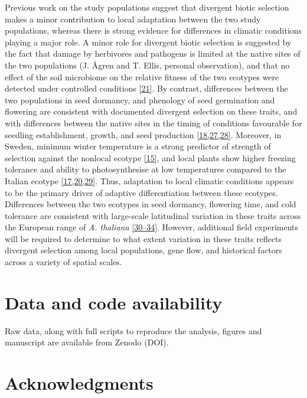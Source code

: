 \documentclass[twocolumn,twoside,lettersize]{article}
\begin{document}
Previous work on the study populations suggest that divergent biotic selection makes a minor contribution to local adaptation between the two study populations, whereas there is strong evidence for differences in climatic conditions playing a major role. A minor role for divergent biotic selection is suggested by the fact that damage by herbivores and pathogens is limited at the native sites of the two populations (J. Ågren and T. Ellis, personal observation), and that no effect of the soil microbiome on the relative fitness of the two ecotypes were detected under controlled conditions \href{https://paperpile.com/c/ktzZ5s/zDkv}{[21]}. By contrast, differences between the two populations in seed dormancy, and phenology of seed germination and flowering are consistent with documented divergent selection on these traits, and with differences between the native sites in the timing of conditions favourable for seedling establishment, growth, and seed production \href{https://paperpile.com/c/ktzZ5s/dJKM+NSsi+cFwF}{[18,27,28]}. Moreover, in Sweden, minimum winter temperature is a strong predictor of strength of selection against the nonlocal ecotype \href{https://paperpile.com/c/ktzZ5s/YZ2m}{[15]}, and local plants show higher freezing tolerance and ability to photosynthesise at low temperatures compared to the Italian ecotype \href{https://paperpile.com/c/ktzZ5s/BGgH+etJs+w7LY}{[17,20,29]}. Thus, adaptation to local climatic conditions appears to be the primary driver of adaptive differentiation between these ecotypes. Differences between the two ecotypes in seed dormancy, flowering time, and cold tolerance are consistent with large-scale latitudinal variation in these traits across the European range of \textit{A. thaliana} \href{https://paperpile.com/c/ktzZ5s/45OL+Ktdn+LRiv+A1ct+EWzG}{[30–34]}. However, additional field experiments will be required to determine to what extent variation in these traits reflects divergent selection among local populations, gene flow, and historical factors across a variety of spatial scales. 


\section*{Data and code availability}

Raw data, along with full scripts to reproduce the analysis, figures and manuscript are available from Zenodo (DOI).

\section*{Acknowledgments}
\end{document}
